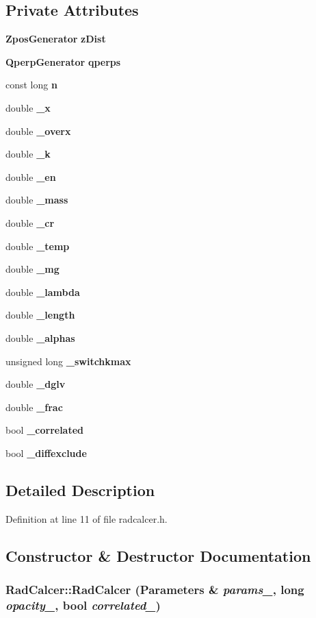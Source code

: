 \subsection*{Private Attributes}
\begin{CompactItemize}
\item 
{\bf ZposGenerator} {\bf zDist}
\item 
{\bf QperpGenerator} {\bf qperps}
\item 
const long {\bf n}
\item 
double {\bf \_\-x}
\item 
double {\bf \_\-overx}
\item 
double {\bf \_\-k}
\item 
double {\bf \_\-en}
\item 
double {\bf \_\-mass}
\item 
double {\bf \_\-cr}
\item 
double {\bf \_\-temp}
\item 
double {\bf \_\-mg}
\item 
double {\bf \_\-lambda}
\item 
double {\bf \_\-length}
\item 
double {\bf \_\-alphas}
\item 
unsigned long {\bf \_\-switchkmax}
\item 
double {\bf \_\-dglv}
\item 
double {\bf \_\-frac}
\item 
bool {\bf \_\-correlated}
\item 
bool {\bf \_\-diffexclude}
\end{CompactItemize}


\subsection{Detailed Description}


Definition at line 11 of file radcalcer.h.

\subsection{Constructor \& Destructor Documentation}
\subsubsection{\setlength{\rightskip}{0pt plus 5cm}RadCalcer::RadCalcer ({\bf Parameters} \& {\em params\_\-}, long {\em opacity\_\-}, bool {\em correlated\_\-})}\label{classRadCalcer_e287ad55adcf2d34ac95c6d339337e42}




